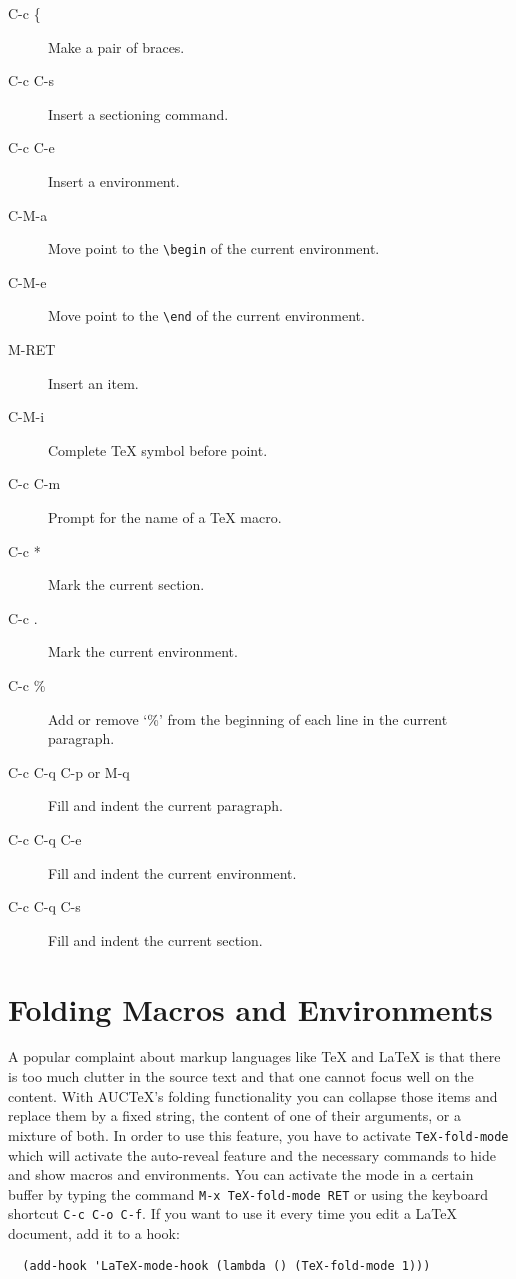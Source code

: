 \begin{description}
\item[C-c \{] Make a pair of braces.
\item[C-c C-s] Insert a sectioning command.
\item[C-c C-e] Insert a environment.
\item[C-M-a] Move point to the \verb|\begin| of the current environment.
\item[C-M-e] Move point to the \verb|\end| of the current environment.
\item[M-RET] Insert an item.
\item[C-M-i] Complete TeX symbol before point.
\item[C-c C-m] Prompt for the name of a TeX macro.
\item[C-c *] Mark the current section.
\item[C-c .] Mark the current environment.
\item[C-c \%] Add or remove ‘\%’ from the beginning of each line in the current paragraph.
\item[C-c C-q C-p or M-q] Fill and indent the current paragraph.
\item[C-c C-q C-e] Fill and indent the current environment.
\item[C-c C-q C-s] Fill and indent the current section.
\end{description}

\section{Folding Macros and Environments}

A popular complaint about markup languages like TeX and LaTeX is that there is too much clutter in the source text and that one cannot focus well on the content.
With AUCTeX’s folding functionality you can collapse those items and replace them by a fixed string, the content of one of their arguments, or a mixture of both.
In order to use this feature, you have to activate \verb|TeX-fold-mode| which will activate the auto-reveal feature and the necessary commands to hide and show macros and environments.
You can activate the mode in a certain buffer by typing the command \verb|M-x TeX-fold-mode RET| or using the keyboard shortcut \verb|C-c C-o C-f|.
If you want to use it every time you edit a LaTeX document, add it to a hook:

\lstset{language=Lisp}
\begin{lstlisting}
  (add-hook 'LaTeX-mode-hook (lambda () (TeX-fold-mode 1)))
\end{lstlisting}


